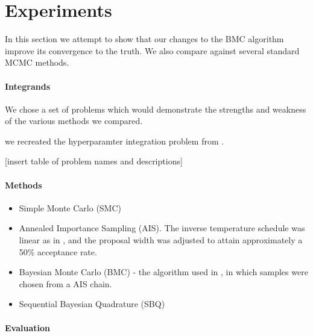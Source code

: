 \documentclass{article}
\begin{document}
\section{Experiments}

In this section we attempt to show that our changes to the BMC algorithm improve its convergence to the truth.  We also compare against several standard MCMC methods.

\paragraph{Integrands}

We chose a set of problems which would demonstrate the strengths and weakness of the various methods we compared.

we recreated the hyperparamter integration problem from \citep{BZMonteCarlo}.

[insert table of problem names and descriptions]

\paragraph{Methods}

\begin{itemize}
\item Simple Monte Carlo (SMC)
\item Annealed Importance Sampling (AIS).  The inverse temperature schedule was linear as in \citep{BZMonteCarlo}, and the proposal width was adjusted to attain approximately a 50\% acceptance rate.
\item Bayesian Monte Carlo (BMC) - the algorithm used in \citep{BZMonteCarlo}, in which samples were chosen from a AIS chain.
\item Sequential Bayesian Quadrature (SBQ)
\end{itemize}

\paragraph{Evaluation}
\end{document}
